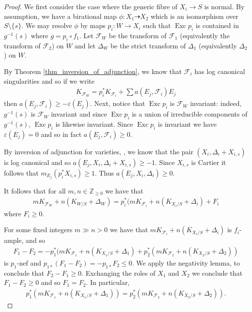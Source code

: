 \documentclass[12pt, a4paper]{amsart}
\DeclareMathOperator{\exc}{Exc}
\newcounter{Theorem}
\theoremstyle{definition}
\theoremstyle{named}
\begin{document}
\begin{proof}
We first consider the case where the generic fibre of $X_i \rightarrow S$ is normal. By assumption, we have a birational map $\phi\colon X_1 \dashrightarrow X_2$ which is an isomorphism 
over $S \setminus \{s\}$.  We may resolve
$\phi$ by maps $p_i\colon W \rightarrow X_i$  such that $\exc p_i$ 
is contained in $g^{-1}(s)$ where $g = p_i\circ f_1$.  Let $\mathcal F_W$ be the transform 
of $\mathcal F_1$ (equivalently the transform of $\mathcal F_2$) on $W$ and let $\Delta_W$ be the strict transform of $\Delta_1$ (equivalently $\Delta_2$) on $W$.


By Theorem \ref{thm_inversion_of_adjunction},
we know that $\mathcal F_i$ has log canonical singularities
and so if we write \begin{align*}K_{\mathcal F_W} = p_i^*K_{\mathcal F_i}+\sum a(E_j, \mathcal F_i)E_j\end{align*} then $a(E_j, \mathcal F_i) \geq -\varepsilon(E_j)$.  Next, notice that  
    $\exc p_i$ is $\mathcal F_W$ invariant:
indeed, $g^{-1}(s)$ is $\mathcal F_W$ invariant and since $\exc p_i$
is a union of irreducible components of $g^{-1}(s)$, $\exc p_i$ is likewise invariant. Since $\exc p_i$ is invariant we
have $\varepsilon(E_j) = 0$ and so in 
fact $a(E_j, \mathcal F_i) \geq 0$.

By inversion of adjunction for varieties, \cite{Kawakita05}, we know
that the pair $(X_i, \Delta_i+X_{i, s})$ is log canonical
and so $a(E_j, X_i, \Delta_i+X_{i, s}) \geq -1$.
Since $X_{i, s}$ is Cartier it follows that 
$m_{E_j}(p_i^*X_{i, s}) \geq 1$.  Thus $a(E_j, X_i, \Delta_i) \geq 0$.



It follows that for all $m, n \in \mathbb Z_{\ge 0}$
we have that \begin{align*}mK_{\mathcal F_W}+n(K_{W/S}+\Delta_W) = p_i^*(mK_{\mathcal F_i}+n(K_{X_i/S}+\Delta_i)+F_i\end{align*} 
where $F_i \geq 0$.

For some fixed integers $m \gg n >0$ we have that $mK_{\mathcal F_i}+n(K_{X_i/S}+\Delta_i)$ is $f_i$-ample,
and so
\begin{align*}F_1-F_2 = -p_1^*(mK_{\mathcal F_1}+n(K_{X_1/S}+\Delta_1)+p_2^*(mK_{\mathcal F_2}+n(K_{X_2/S}+\Delta_2))\end{align*} is $p_1$-nef
and $p_{1*}(F_1-F_2) = -p_{1*}F_2 \leq 0$.
We apply the negativity lemma, \cite[Lemma 3.39]{KM98} to conclude that $F_2-F_1 \ge 0$. 
Exchanging the roles of $X_1$ and $X_2$ we conclude 
that $F_1-F_2 \ge 0$ and so $F_1= F_2$.
In particular, 
\begin{align}
\label{eq_crepant}
   p_1^*(mK_{\mathcal F_1}+n(K_{X_1/S}+\Delta_1)) = p_2^*(mK_{\mathcal F_2}+n(K_{X_2/S}+\Delta_2)). 
\end{align}



\end{proof}
\end{document}
